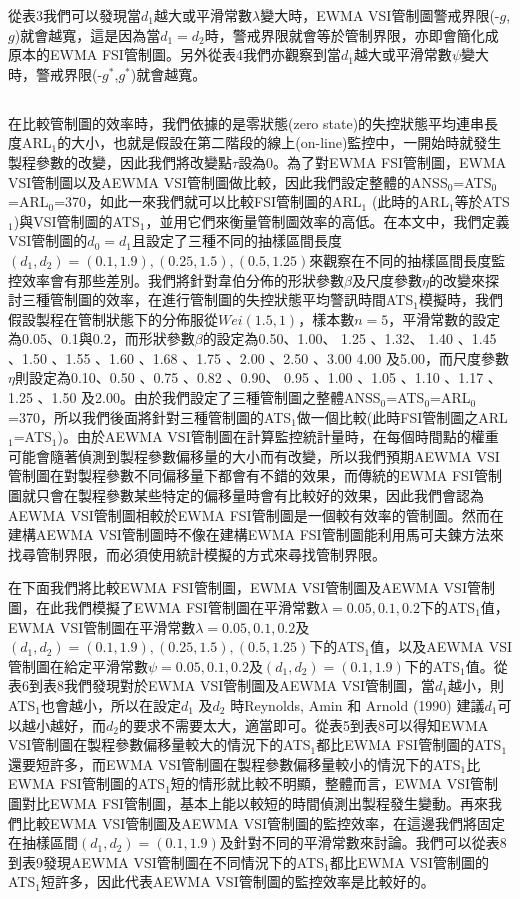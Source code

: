 \documentclass[12pt]{article}  %
\theoremstyle{plain}
\begin{document}
從表3我們可以發現當$d_1$越大或平滑常數$\lambda$變大時，EWMA VSI管制圖警戒界限(-$g$,$g$)就會越寬，這是因為當$d_1=d_2$時，警戒界限就會等於管制界限，亦即會簡化成原本的EWMA FSI管制圖。另外從表4我們亦觀察到當$d_1$越大或平滑常數$\psi$變大時，警戒界限(-$g^*$,$g^*$)就會越寬。

\subsection{}
在比較管制圖的效率時，我們依據的是零狀態(zero state)的失控狀態平均連串長度ARL$_1$的大小，也就是假設在第二階段的線上(on-line)監控中，一開始時就發生製程參數的改變，因此我們將改變點$\tau$設為0。為了對EWMA FSI管制圖，EWMA VSI管制圖以及AEWMA VSI管制圖做比較，因此我們設定整體的ANSS$_0$=ATS$_0$=ARL$_0$=370，如此一來我們就可以比較FSI管制圖的ARL$_1$ (此時的ARL$_1$等於ATS$_1$)與VSI管制圖的ATS$_1$，並用它們來衡量管制圖效率的高低。在本文中，我們定義VSI管制圖的$d_0=d_1$且設定了三種不同的抽樣區間長度$(d_1,d_2)=(0.1,1.9),(0.25,1.5),(0.5,1.25)$來觀察在不同的抽樣區間長度監控效率會有那些差別。我們將針對韋伯分佈的形狀參數$\beta$及尺度參數$\eta$的改變來探討三種管制圖的效率，在進行管制圖的失控狀態平均警訊時間ATS$_1$模擬時，我們假設製程在管制狀態下的分佈服從$Wei(1.5,1)$，樣本數$n=5$，平滑常數的設定為0.05、0.1與0.2，而形狀參數$\beta$的設定為0.50、1.00、 1.25 、1.32、 1.40 、1.45 、1.50 、1.55 、1.60 、1.68 、1.75 、2.00 、2.50 、3.00 4.00 及5.00，而尺度參數$\eta$則設定為0.10、0.50 、0.75 、0.82 、0.90、 0.95 、1.00 、1.05 、1.10 、1.17 、1.25 、1.50 及2.00。由於我們設定了三種管制圖之整體ANSS$_0$=ATS$_0$=ARL$_0$=370，所以我們後面將針對三種管制圖的ATS$_1$做一個比較(此時FSI管制圖之ARL$_1$=ATS$_1$)。由於AEWMA VSI管制圖在計算監控統計量時，在每個時間點的權重可能會隨著偵測到製程參數偏移量的大小而有改變，所以我們預期AEWMA VSI管制圖在對製程參數不同偏移量下都會有不錯的效果，而傳統的EWMA FSI管制圖就只會在製程參數某些特定的偏移量時會有比較好的效果，因此我們會認為AEWMA VSI管制圖相較於EWMA FSI管制圖是一個較有效率的管制圖。然而在建構AEWMA VSI管制圖時不像在建構EWMA FSI管制圖能利用馬可夫鍊方法來找尋管制界限，而必須使用統計模擬的方式來尋找管制界限。

在下面我們將比較EWMA FSI管制圖，EWMA VSI管制圖及AEWMA VSI管制圖，在此我們模擬了EWMA FSI管制圖在平滑常數$\lambda=0.05,0.1,0.2$下的ATS$_1$值，
EWMA VSI管制圖在平滑常數$\lambda=0.05,0.1,0.2$及$(d_1,d_2)=(0.1,1.9),(0.25,1.5),(0.5,1.25)$下的ATS$_1$值，以及AEWMA VSI管制圖在給定平滑常數$\psi=0.05,0.1,0.2$及$(d_1,d_2)=(0.1,1.9)$下的ATS$_1$值。從表6到表8我們發現對於EWMA VSI管制圖及AEWMA VSI管制圖，當$d_1$越小，則ATS$_1$也會越小，所以在設定$d_1$ 及$d_2$ 時Reynolds, Amin 和 Arnold (1990) 建議$d_1$可以越小越好，而$d_2$的要求不需要太大，適當即可。從表5到表8可以得知EWMA VSI管制圖在製程參數偏移量較大的情況下的ATS$_1$都比EWMA FSI管制圖的ATS$_1$還要短許多，而EWMA VSI管制圖在製程參數偏移量較小的情況下的ATS$_1$比EWMA FSI管制圖的ATS$_1$短的情形就比較不明顯，整體而言，EWMA VSI管制圖對比EWMA FSI管制圖，基本上能以較短的時間偵測出製程發生變動。再來我們比較EWMA VSI管制圖及AEWMA VSI管制圖的監控效率，在這邊我們將固定在抽樣區間$(d_1,d_2)=(0.1,1.9)$及針對不同的平滑常數來討論。我們可以從表8到表9發現AEWMA VSI管制圖在不同情況下的ATS$_1$都比EWMA VSI管制圖的ATS$_1$短許多，因此代表AEWMA VSI管制圖的監控效率是比較好的。
\end{document}
